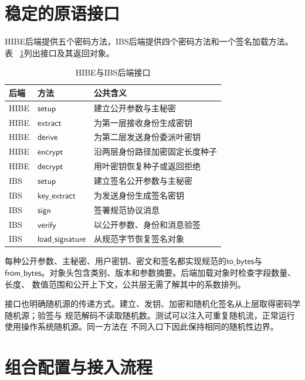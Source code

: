 \section{稳定的原语接口}

HIBE后端提供五个密码方法，IBS后端提供四个密码方法和一个签名加载方法。表
~\ref{tab:backend-interfaces}列出接口及其返回对象。

\begin{table}[H]
\centering\small
\caption{HIBE与IBS后端接口}
\label{tab:backend-interfaces}
\begin{tabularx}{\textwidth}{@{}p{}p{}X@{}}
\toprule
\rowcolor{black!8} 后端 & 方法 & 公共含义 \\
\midrule
HIBE & $\mathsf{setup}$ & 建立公开参数与主秘密 \\
HIBE & $\mathsf{extract}$ & 为第一层接收身份生成密钥 \\
HIBE & $\mathsf{derive}$ & 为第二层发送身份委派叶密钥 \\
HIBE & $\mathsf{encrypt}$ & 沿两层身份路径加密固定长度种子 \\
HIBE & $\mathsf{decrypt}$ & 用叶密钥恢复种子或返回拒绝 \\
\midrule
IBS & $\mathsf{setup}$ & 建立签名公开参数与主秘密 \\
IBS & $\mathsf{key\_extract}$ & 为发送身份生成签名密钥 \\
IBS & $\mathsf{sign}$ & 签署规范协议消息 \\
IBS & $\mathsf{verify}$ & 以公开参数、身份和消息验签 \\
IBS & $\mathsf{load\_signature}$ & 从规范字节恢复签名对象 \\
\bottomrule
\end{tabularx}
\end{table}

每种公开参数、主秘密、用户密钥、密文和签名都实现规范的$\mathsf{to\_bytes}$与
$\mathsf{from\_bytes}$。对象头包含类别、版本和参数摘要。后端加载对象时检查字段数量、长度、
数值范围和公开上下文，公共层无需了解其中的系数排列。

接口也明确随机源的传递方式。建立、发钥、加密和随机化签名从上层取得密码学随机源；验签与
规范解码不读取随机数。测试可以注入可重复随机流，正常运行使用操作系统随机源。同一方法在
不同入口下因此保持相同的随机性边界。

\section{组合配置与接入流程}

